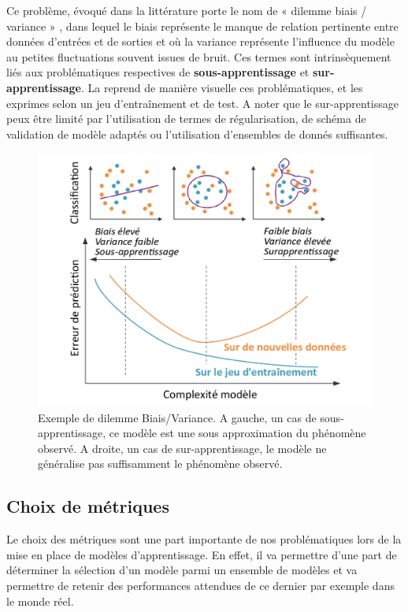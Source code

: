 Ce problème, évoqué dans la littérature porte le nom de « dilemme biais / variance » , dans lequel le biais représente le manque de relation pertinente entre données d’entrées et de sorties et où la variance représente l’influence du modèle au petites fluctuations souvent issues de bruit. Ces termes sont intrinsèquement liés aux problématiques respectives de \textbf{sous-apprentissage} et \textbf{sur-apprentissage}. La  reprend de manière visuelle ces problématiques, et les exprimes selon un jeu d’entraînement et de test. A noter que le sur-apprentissage peux être limité par l’utilisation de termes de régularisation, de schéma de validation de modèle adaptés ou l’utilisation d’ensembles de donnés suffisantes.\par
 
\begin{figure}[H]
    \centering
    \includegraphics[width=0.8\linewidth]{contents/chapter_3/resources/example_underfit_overfit.pdf}
    \caption{Exemple de dilemme Biais/Variance. A gauche, un cas de sous-apprentissage, ce modèle est une sous approximation du phénomène observé. A droite, un cas de sur-apprentissage, le modèle ne généralise pas suffisamment le phénomène observé.}
    \label{fig:example_underfit_overfit}
\end{figure}

\subsection{Choix de métriques}
\label{subsec:metrics}
Le choix des métriques sont une part importante de nos problématiques lors de la mise en place de modèles d’apprentissage. En effet, il va permettre d'une part de déterminer la sélection d'un modèle parmi un ensemble de modèles et va permettre de retenir des performances attendues de ce dernier par exemple dans le monde réel.\par

